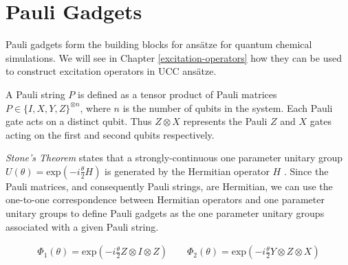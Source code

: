 \chapter{Pauli Gadgets}%
\label{pauli-gadgets}

Pauli gadgets form the building blocks for ansätze for quantum chemical simulations. We will see in Chapter \ref{excitation-operators} how they can be used to construct excitation operators in UCC ansätze.

A Pauli string $P$ is defined as a tensor product of Pauli matrices $P \in \{I, X, Y, Z\}^{\otimes n}$, where $n$ is the number of qubits in the system. Each Pauli gate acts on a distinct qubit. Thus $Z \otimes X$ represents the Pauli $Z$ and $X$ gates acting on the first and second qubits respectively.

\textit{Stone's Theorem} states that a strongly-continuous one parameter unitary group $U(\theta) = \text{exp} \left(- i \frac{\theta}{2} H \right)$ is generated by the Hermitian operator $H$ \cite{Stone1932}. Since the Pauli matrices, and consequently Pauli strings, are Hermitian, we can use the one-to-one correspondence between Hermitian operators and one parameter unitary groups to define Pauli gadgets as the one parameter unitary groups associated with a given Pauli string.

\begin{gather*}
    \Phi_1(\theta) = \text{exp}\left(- i \frac{\theta}{2} Z \otimes I \otimes Z \right) \qquad
    \Phi_2(\theta) = \text{exp}\left(- i \frac{\theta}{2} Y \otimes Z \otimes X \right)%
\end{gather*}
